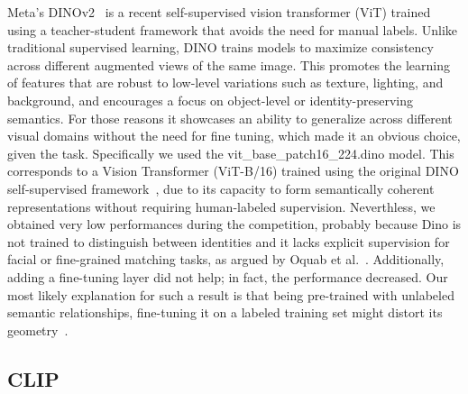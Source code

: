 Meta's DINOv2~\cite{caron2021emerging} is a recent self-supervised vision transformer (ViT) trained using a teacher-student framework that avoids the need for manual labels. Unlike traditional supervised learning, DINO trains models to maximize consistency across different augmented views of the same image.
This promotes the learning of features that are robust to low-level variations such as texture, lighting, and background, and encourages a focus on object-level or identity-preserving semantics.
For those reasons it showcases an ability to generalize across different visual domains without the need for fine tuning, which made it an obvious choice, given the task.
Specifically we used the vit\_base\_patch16\_224.dino model. This corresponds to a Vision Transformer (ViT-B/16) trained using the original DINO self-supervised framework~\cite{caron2021emerging}, due to its capacity to form semantically coherent representations without requiring human-labeled supervision.
Neverthless, we obtained very low performances during the competition, probably because Dino is not trained to distinguish between identities and it lacks explicit supervision for facial or fine-grained matching tasks, as argued by Oquab et al.~\cite{oquab2023dinov2}.
Additionally, adding a fine-tuning layer did not help; in fact, the performance decreased. Our most likely explanation for such a result is that being pre-trained with unlabeled semantic relationships, fine-tuning it on a labeled training set might distort its geometry~\cite{oquab2023dinov2}.


\subsection{CLIP}

